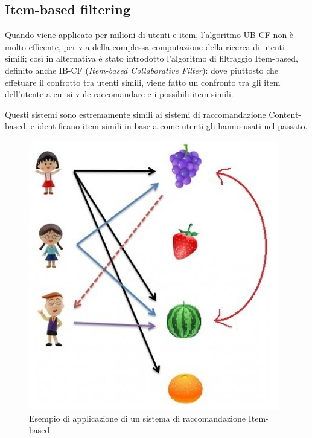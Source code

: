 \subsection{Item-based filtering} \hfill \break


Quando viene applicato per milioni di utenti e item, l'algoritmo UB-CF non è molto efficente, per via della complessa computazione della 
ricerca di utenti simili; così in alternativa è stato introdotto l'algoritmo di filtraggio Item-based, definito anche IB-CF 
(\textit{Item-based Collaborative Filter}): dove piuttosto che effetuare il confrotto tra utenti simili, viene fatto un confronto tra 
gli item dell'utente a cui si vule raccomandare e i possibili item simili.

Questi sistemi sono estremamente simili ai sistemi di raccomandazione Content-based, e identificano item simili in base a come utenti gli
hanno usati nel passato.


\cite{item-based-collaborative-filtering}

\begin{figure}[ht!]
	\centering
	\includegraphics[scale=0.5]{images/IB_CF_ex.PNG}
	\caption{Esempio di applicazione di un sistema di raccomandazione Item-based}
	\label{fig:IB_CF}
\end{figure}

